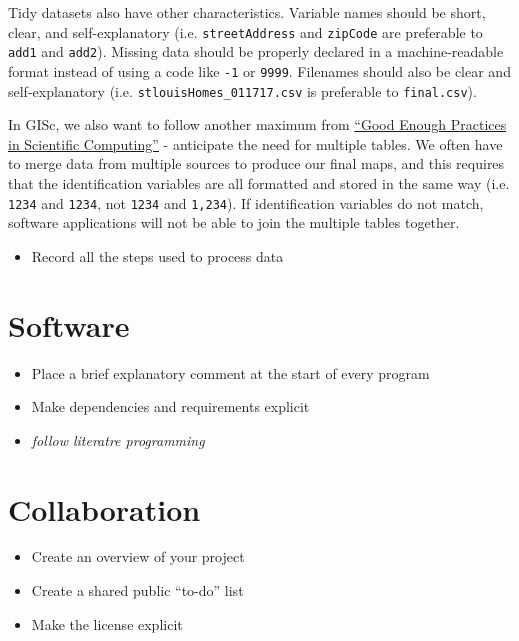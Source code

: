 \documentclass[]{book}
\providecommand{\tightlist}{%
  \setlength{\itemsep}{0pt}\setlength{\parskip}{0pt}}
\begin{document}
Tidy datasets also have other characteristics. Variable names should be
short, clear, and self-explanatory (i.e. \texttt{streetAddress} and
\texttt{zipCode} are preferable to \texttt{add1} and \texttt{add2}).
Missing data should be properly declared in a machine-readable format
instead of using a code like \texttt{-1} or \texttt{9999}. Filenames
should also be clear and self-explanatory (i.e.
\texttt{stlouisHomes\_011717.csv} is preferable to \texttt{final.csv}).

In GISc, we also want to follow another maximum from
\href{https://arxiv.org/abs/1609.00037}{``Good Enough Practices in
Scientific Computing''} - anticipate the need for multiple tables. We
often have to merge data from multiple sources to produce our final
maps, and this requires that the identification variables are all
formatted and stored in the same way (i.e. \texttt{1234} and
\texttt{1234}, not \texttt{1234} and \texttt{1,234}). If identification
variables do not match, software applications will not be able to join
the multiple tables together.

\begin{itemize}
\tightlist
\item
  Record all the steps used to process data
\end{itemize}

\section{Software}\label{software}

\begin{itemize}
\tightlist
\item
  Place a brief explanatory comment at the start of every program
\item
  Make dependencies and requirements explicit
\item
  \emph{follow literatre programming}
\end{itemize}

\section{Collaboration}\label{collaboration}

\begin{itemize}
\tightlist
\item
  Create an overview of your project
\item
  Create a shared public ``to-do'' list
\item
  Make the license explicit
\end{itemize}
\end{document}
